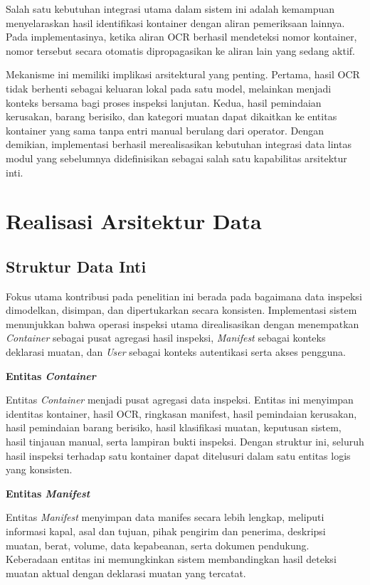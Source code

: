 Salah satu kebutuhan integrasi utama dalam sistem ini adalah kemampuan
menyelaraskan hasil identifikasi kontainer dengan aliran pemeriksaan lainnya.
Pada implementasinya, ketika aliran OCR berhasil mendeteksi nomor kontainer,
nomor tersebut secara otomatis dipropagasikan ke aliran lain yang sedang aktif.

Mekanisme ini memiliki implikasi arsitektural yang penting. Pertama, hasil OCR
tidak berhenti sebagai keluaran lokal pada satu model, melainkan menjadi konteks
bersama bagi proses inspeksi lanjutan. Kedua, hasil pemindaian kerusakan,
barang berisiko, dan kategori muatan dapat dikaitkan ke entitas kontainer yang
sama tanpa entri manual berulang dari operator. Dengan demikian, implementasi
berhasil merealisasikan kebutuhan integrasi data lintas modul yang sebelumnya
didefinisikan sebagai salah satu kapabilitas arsitektur inti.

\section{Realisasi Arsitektur Data}
\label{sec:realisasi-arsitektur-data}

\subsection{Struktur Data Inti}
\label{subsec:struktur-data-inti}

Fokus utama kontribusi pada penelitian ini berada pada bagaimana data inspeksi
dimodelkan, disimpan, dan dipertukarkan secara konsisten. Implementasi sistem
menunjukkan bahwa operasi inspeksi utama direalisasikan dengan menempatkan
\textit{Container} sebagai pusat agregasi hasil inspeksi, \textit{Manifest}
sebagai konteks deklarasi muatan, dan \textit{User} sebagai konteks autentikasi
serta akses pengguna.

\textbf{Entitas \textit{Container}}

Entitas \textit{Container} menjadi pusat agregasi data inspeksi. Entitas ini
menyimpan identitas kontainer, hasil OCR, ringkasan manifest, hasil pemindaian
kerusakan, hasil pemindaian barang berisiko, hasil klasifikasi muatan, keputusan
sistem, hasil tinjauan manual, serta lampiran bukti inspeksi. Dengan struktur
ini, seluruh hasil inspeksi terhadap satu kontainer dapat ditelusuri dalam satu
entitas logis yang konsisten.

\textbf{Entitas \textit{Manifest}}

Entitas \textit{Manifest} menyimpan data manifes secara lebih lengkap, meliputi
informasi kapal, asal dan tujuan, pihak pengirim dan penerima, deskripsi muatan,
berat, volume, data kepabeanan, serta dokumen pendukung. Keberadaan entitas ini
memungkinkan sistem membandingkan hasil deteksi muatan aktual dengan deklarasi
muatan yang tercatat.

